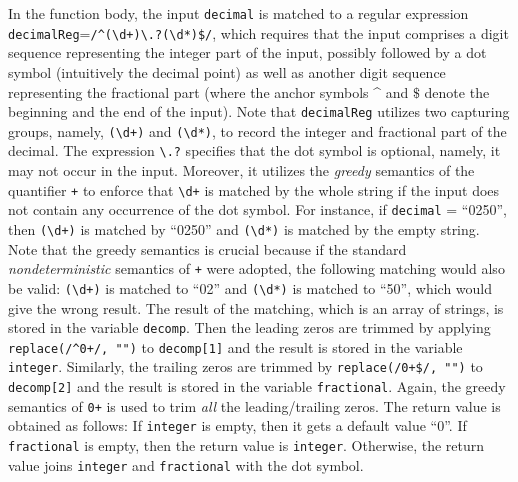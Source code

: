In the function body, the input {\tt decimal} %
is matched to a regular expression {\tt decimalReg}={\tt /\^{}({\footnotesize\textbackslash}d+){\footnotesize\textbackslash}.?({\footnotesize\textbackslash}d*)\$/}, which requires that  the input comprises a digit sequence representing the integer part of the input, possibly followed by a dot symbol (intuitively the decimal point) as well as another digit sequence representing the fractional part (where the anchor symbols \^{} and $\$$ denote the beginning and the end of the input). Note that  {\tt decimalReg} utilizes two capturing groups, namely, {\tt ({\footnotesize\textbackslash}d+)} and {\tt ({\footnotesize\textbackslash}d*)}, to record the integer and fractional part of the decimal. The expression {\tt {\footnotesize\textbackslash}.?} specifies that the dot symbol is optional, namely, it may not occur in the input. Moreover,  it utilizes the \emph{greedy} semantics of the quantifier {\tt +} to enforce that {\tt {\footnotesize\textbackslash}d+} is matched by the whole string if the input does not contain any occurrence of the dot symbol. For instance, if {\tt decimal} = ``0250'', then {\tt ({\footnotesize\textbackslash}d+)} is matched by ``0250'' and  {\tt ({\footnotesize\textbackslash}d*)} is matched by the empty string. 
Note that the greedy semantics is crucial because if the standard \emph{nondeterministic} semantics of {\tt +} were adopted, the following matching would also be valid: {\tt ({\footnotesize\textbackslash}d+)} is matched to ``02'' and {\tt ({\footnotesize\textbackslash}d*)} is matched to ``50'', which would give the wrong result.  The result of the matching, which is an array of strings, is stored in the variable {\tt decomp}. 
%
Then the leading zeros are trimmed by applying {\tt replace(/\^{}0+/, "")} to {\tt decomp[1]} and the result is stored in the variable {\tt integer}. Similarly, the trailing zeros are trimmed by {\tt replace(/{}0+\$/, "")} to {\tt decomp[2]} and the result is stored in the variable {\tt fractional}. Again, the greedy semantics of {\tt 0+} is used to trim \emph{all} the leading/trailing zeros.
%
The return value is obtained as follows: If {\tt integer} is empty, then it gets a default value ``0''. If {\tt fractional} is empty, then the return value is {\tt integer}. Otherwise, the return value  joins {\tt integer} and {\tt fractional} with the dot symbol. 

